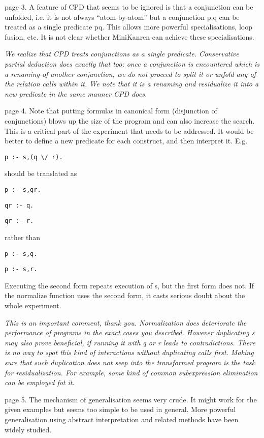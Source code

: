 page 3. A feature of CPD that seems to be ignored is that a conjunction can be unfolded, i.e. it is not always ``atom-by-atom'' but a conjunction p,q can be treated as a single predicate pq.  This allows more powerful specialisations, loop fusion, etc.  It is not clear whether MiniKanren can achieve these specialisations.

\emph{We realize that CPD treats conjunctions as a single predicate. Conservative partial deduction does exactly that too: once a conjunction is encountered which is a renaming of another conjunction, we do not proceed to split it or unfold any of the relation calls within it. We note that it is a renaming and residualize it into a new predicate in the same manner CPD does.}


page 4.  Note that putting formulas in canonical form (disjunction of conjunctions) blows up the size of the program and can also increase the search.  This is a critical part of the experiment that needs to be addressed.  It would be better to define a new predicate for each construct, and then interpret it.  E.g.

\verb!p :- s,(q \/ r).!

should be translated as

\verb!p :- s,qr.!

\verb!qr :- q.!

\verb!qr :- r.!

rather than

\verb!p :- s,q.!

\verb!p :- s,r.!

Executing the second form repeats execution of s, but the first form does not.  If the normalize function uses the second form, it casts serious doubt about the whole experiment.

\emph{This is an important comment, thank you. Normalization does deteriorate the performance of programs in the exact cases you described. However duplicating s may also prove beneficial, if running it with q or r leads to contradictions. There is no way to spot this kind of interactions without duplicating calls first. Making sure that such duplication does not seep into the transformed program is the task for residualization. For example, some kind of common subexpression elimination can be employed fot it. }

page 5.  The mechanism of generalisation seems very crude.  It might work for the given examples but seems too simple to be used in general.  More powerful generalisation using abstract interpretation and related methods have been widely studied.

